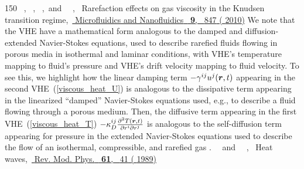 \documentclass[
prb,
twocolumn,
superscriptaddress,
 amsmath,amssymb,
 aps,
longbibliography,
]{revtex4-2}
\begin{document}
\begin{thebibliography}{150}
  \BibitemOpen
   { {\ },  {\ },  {\ },\ and\  {\ },\ } { {Rarefaction effects on gas viscosity in the {Knudsen} transition regime},\ }\href {https://doi.org/10.1007/s10404-010-0606-3} { { {Microfluidics and Nanofluidics}\ }\textbf { {9}},\  {847} ( {2010})}
  \BibitemOpen
   {We note that the VHE have a mathematical form analogous to the damped and diffusion-extended Navier-Stokes equations, used to describe rarefied fluids flowing in porous media in isothermal and laminar conditions, with VHE's temperature mapping to fluid's pressure and VHE's drift velocity mapping to fluid velocity. To see this, we highlight how the linear damping term $-\gamma ^{ij}u^j(\protect \bm {r},t)$ appearing in the second VHE~(\ref {viscous_heat_U}) is analogous to the dissipative term appearing in the linearized ``damped'' Navier-Stokes equations \cite {balasubramanian_darcys_1987,dardis_lattice_1998,bresch_existence_2003,cai_weak_2008,zhang_uniqueness_2011} used, e.g., to describe a fluid flowing through a porous medium. Then, the diffusive term appearing in the first VHE~(\ref {viscous_heat_T}) $-\kappa _D^{ij}\protect \tfrac {\partial ^2 T(\protect \bm {r},t)}{\partial r^i\partial r^j}$ is analogous to the self-diffusion term appearing for pressure in the extended Navier-Stokes equations \cite {brenner_navierstokes_2005,sambasivam_numerical_2014,schwarz_openfoam_2023} used to describe the flow of an isothermal, compressible, and rarefied gas \cite {maurer_second-order_2003,dongari_pressure-driven_2009}.}
  \BibitemOpen
   { {\ }\ and\  {~},\ } { {Heat waves},\ }\href {https://link.aps.org/doi/10.1103/RevModPhys.61.41} { { {Rev. Mod. Phys.}\ }\textbf { {61}},\  {41} ( {1989})}

\end{thebibliography}
\end{document}
